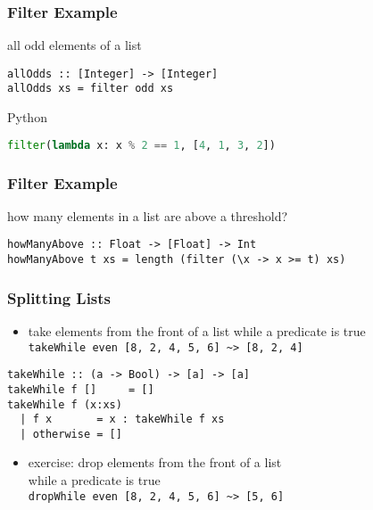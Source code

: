 \documentclass[dvipsnames]{beamer}
\theoremstyle{plain}
\begin{document}
\begin{frame}[fragile]
  \frametitle{Filter Example}

  \begin{exampleblock}{all odd elements of a list}
    \begin{lstlisting}
allOdds :: [Integer] -> [Integer]
allOdds xs = filter odd xs
    \end{lstlisting}
  \end{exampleblock}

  \bigskip
  \begin{exampleblock}{Python}
    \begin{lstlisting}[language=Python]
filter(lambda x: x % 2 == 1, [4, 1, 3, 2])
    \end{lstlisting}
  \end{exampleblock}
\end{frame}

\begin{frame}[fragile]
  \frametitle{Filter Example}

  \begin{exampleblock}{how many elements in a list are above a threshold?}
    \begin{lstlisting}
howManyAbove :: Float -> [Float] -> Int
howManyAbove t xs = length (filter (\x -> x >= t) xs)
    \end{lstlisting}
  \end{exampleblock}
\end{frame}

\begin{frame}[fragile]
  \frametitle{Splitting Lists}

  \begin{itemize}
    \item take elements from the front of a list while a predicate is true\\
      \lstinline|takeWhile even [8, 2, 4, 5, 6] ~> [8, 2, 4]|
  \end{itemize}

  \begin{exampleblock}{}
    \begin{lstlisting}[deletekeywords={takeWhile}]
takeWhile :: (a -> Bool) -> [a] -> [a]
takeWhile f []     = []
takeWhile f (x:xs)
  | f x       = x : takeWhile f xs
  | otherwise = []
    \end{lstlisting}
  \end{exampleblock}

  \pause
  \begin{itemize}
    \item exercise: drop elements from the front of a list\\
      while a predicate is true\\
      \lstinline|dropWhile even [8, 2, 4, 5, 6] ~> [5, 6]|
  \end{itemize}
\end{frame}
\end{document}
